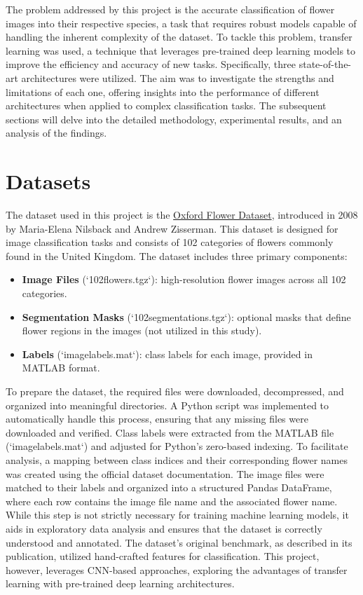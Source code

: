 The problem addressed by this project is the accurate classification of flower images into their respective species,
a task that requires robust models capable of handling the inherent complexity of the dataset. To tackle this problem,
transfer learning was used, a technique that leverages pre-trained deep learning models to improve the efficiency and
accuracy of new tasks. Specifically, three state-of-the-art architectures were utilized. The aim was to investigate the
strengths and limitations of each one, offering insights into the performance of different architectures when applied
to complex classification tasks. The subsequent sections will delve into the detailed methodology, experimental
results, and an analysis of the findings.

\section{Datasets}
The dataset used in this project is the \href{https://www.robots.ox.ac.uk/~vgg/data/flowers/102/index.html}{Oxford Flower Dataset},
introduced in 2008 by Maria-Elena Nilsback and Andrew Zisserman. This dataset is designed for image classification tasks
and consists of 102 categories of flowers commonly found in the United Kingdom. The dataset includes three primary components:

\begin{itemize}
 \item \textbf{Image Files} (`102flowers.tgz`): high-resolution flower images across all 102 categories.
 \item \textbf{Segmentation Masks} (`102segmentations.tgz`): optional masks that define flower regions in the images (not utilized in this study).
 \item \textbf{Labels} (`imagelabels.mat`): class labels for each image, provided in MATLAB format.
\end{itemize}

To prepare the dataset, the required files were downloaded, decompressed, and organized into meaningful directories.
A Python script was implemented to automatically handle this process, ensuring that any missing files were downloaded
and verified. Class labels were extracted from the MATLAB file (`imagelabels.mat`) and adjusted for Python’s zero-based
indexing. To facilitate analysis, a mapping between class indices and their corresponding flower names was created using
the official dataset documentation. The image files were matched to their labels and organized into a structured Pandas
DataFrame, where each row contains the image file name and the associated flower name. While this step is not strictly
necessary for training machine learning models, it aids in exploratory data analysis and ensures that the dataset is
correctly understood and annotated. The dataset's original benchmark, as described in its publication, utilized
hand-crafted features for classification. This project, however, leverages CNN-based approaches, exploring the
advantages of transfer learning with pre-trained deep learning architectures.

